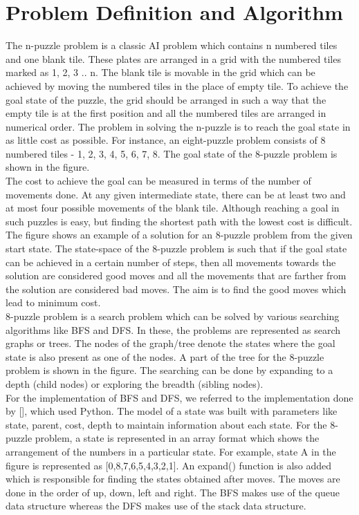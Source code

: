 \documentclass{svproc}
\begin{document}
\section{Problem Definition and Algorithm}
The n-puzzle problem is a classic AI problem which contains n numbered tiles and one blank tile. These plates are arranged in a grid with the numbered tiles marked as 1, 2, 3 .. n. The blank tile is movable in the grid which can be achieved by moving the numbered tiles in the place of empty tile. To achieve the goal state of the puzzle, the grid should be arranged in such a way that the empty tile is at the first position and all the numbered tiles are arranged in numerical order. The problem in solving the n-puzzle is to reach the goal state in as little cost as possible. For instance, an eight-puzzle problem consists of 8 numbered tiles - 1, 2, 3, 4, 5, 6, 7, 8. The goal state of the 8-puzzle problem is shown in the figure. \\
The cost to achieve the goal can be measured in terms of the number of movements done. At any given intermediate state, there can be at least two and at most four possible movements of the blank tile. Although reaching a goal in such puzzles is easy, but finding the shortest path with the lowest cost is difficult. The figure shows an example of a solution for an 8-puzzle problem from the given start state. The state-space of the 8-puzzle problem is such that if the goal state can be achieved in a certain number of steps, then all movements towards the solution are considered good moves and all the movements that are farther from the solution are considered bad moves. The aim is to find the good moves which lead to minimum cost. \\
8-puzzle problem is a search problem which can be solved by various searching algorithms like BFS and DFS. In these, the problems are represented as search graphs or trees. The nodes of the graph/tree denote the states where the goal state is also present as one of the nodes. A part of the tree for the 8-puzzle problem is shown in the figure. The searching can be done by expanding to a depth (child nodes) or exploring the breadth (sibling nodes). \\
For the implementation of BFS and DFS, we referred to the implementation done by [], which used Python. The model of a state was built with parameters like state, parent, cost, depth to maintain information about each state. For the 8-puzzle problem, a state is represented in an array format which shows the arrangement of the numbers in a particular state. For example, state A in the figure is represented as [0,8,7,6,5,4,3,2,1]. An expand() function is also added which is responsible for finding the states obtained after moves. The moves are done in the order of up, down, left and right. The BFS makes use of the queue data structure whereas the DFS makes use of the stack data structure. \\
\end{document}
